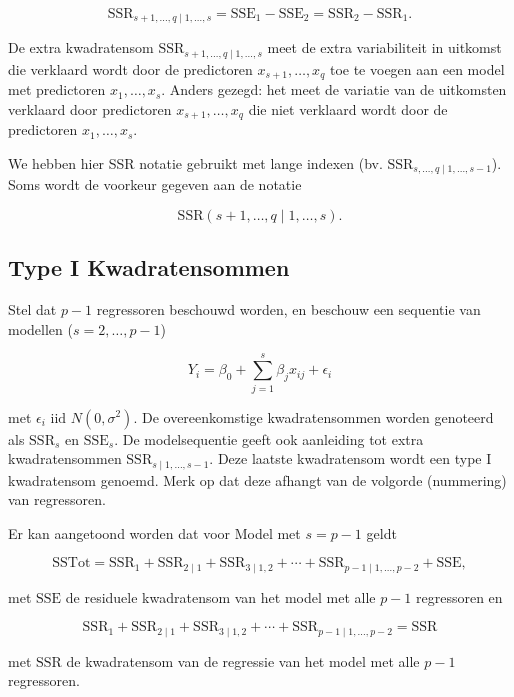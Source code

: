 \documentclass[
  12pt,dutch,coursenotes]{book}
\theoremstyle{definition}
\theoremstyle{definition}
\theoremstyle{definition}
\theoremstyle{remark}
\begin{document}
\[
  \text{SSR}_{s+1, \ldots, q\mid 1,\ldots, s} = \text{SSE}_1-\text{SSE}_2=\text{SSR}_2-\text{SSR}_1.
\]

De extra kwadratensom \(\text{SSR}_{s+1, \ldots, q\mid 1,\ldots, s}\) meet de extra variabiliteit in uitkomst die verklaard wordt door de predictoren \(x_{s+1}, \ldots, x_q\) toe te voegen aan een model met predictoren \(x_1,\ldots, x_{s}\).
Anders gezegd: het meet de variatie van de uitkomsten verklaard door predictoren \(x_{s+1}, \ldots, x_q\) die niet verklaard wordt door de predictoren \(x_1,\ldots, x_{s}\).

We hebben hier SSR notatie gebruikt met lange indexen (bv. \(\text{SSR}_{s, \ldots, q\mid 1,\ldots, s-1}\)). Soms wordt de voorkeur gegeven aan de notatie

\[
  \text{SSR}(s+1, \ldots, q\mid 1,\ldots, s).
\]

\hypertarget{type-i-kwadratensommen}{%
\subsection{Type I Kwadratensommen}\label{type-i-kwadratensommen}}

Stel dat \(p-1\) regressoren beschouwd worden, en beschouw een sequentie van modellen (\(s=2,\ldots, p-1\))

\[
Y_i = \beta_0 + \sum_{j=1}^{s} \beta_j x_{ij} + \epsilon_i
\]

met \(\epsilon_i\text{ iid } N(0,\sigma^{2})\).
De overeenkomstige kwadratensommen worden genoteerd als \(\text{SSR}_{s}\) en \(\text{SSE}_{s}\). De modelsequentie geeft ook aanleiding tot extra kwadratensommen \(\text{SSR}_{s\mid 1,\ldots, s-1}\). Deze laatste kwadratensom wordt een type I kwadratensom genoemd. Merk op dat deze afhangt van de volgorde (nummering) van regressoren.

Er kan aangetoond worden dat voor Model met \(s=p-1\) geldt

\[
 \text{SSTot} = \text{SSR}_1 + \text{SSR}_{2\mid 1} + \text{SSR}_{3\mid 1,2} + \cdots + \text{SSR}_{p-1\mid 1,\ldots, p-2} + \text{SSE},
\]

met \(\text{SSE}\) de residuele kwadratensom van het model met alle \(p-1\) regressoren en

\[
  \text{SSR}_1 + \text{SSR}_{2\mid 1} + \text{SSR}_{3\mid 1,2} + \cdots + \text{SSR}_{p-1\mid 1,\ldots, p-2} = \text{SSR}
\]

met \(\text{SSR}\) de kwadratensom van de regressie van het model met alle \(p-1\) regressoren.
\end{document}
